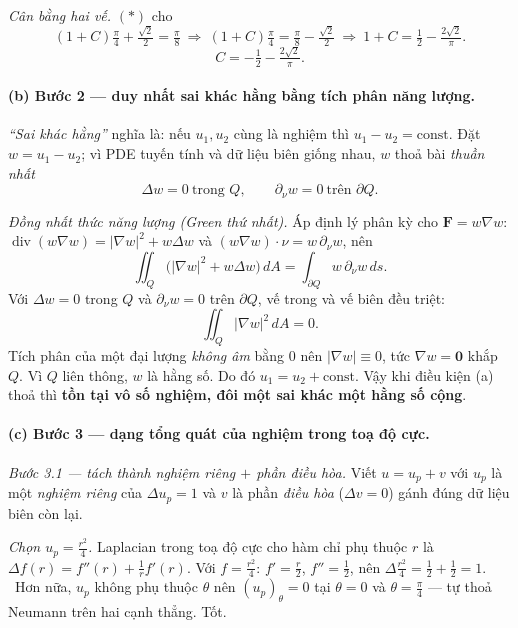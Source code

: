 \emph{Cân bằng hai vế.} $(\ast)$ cho
\[
  (1+C)\tfrac{\pi}{4}+\tfrac{\sqrt2}{2}=\tfrac{\pi}{8}
  \ \Longrightarrow\ (1+C)\tfrac{\pi}{4}=\tfrac{\pi}{8}-\tfrac{\sqrt2}{2}
  \ \Longrightarrow\ 1+C=\tfrac12-\tfrac{2\sqrt2}{\pi}.
\]
\[
  \boxed{\;C=-\tfrac12-\tfrac{2\sqrt2}{\pi}.\;}
\]

\paragraph{(b) Bước 2 --- duy nhất sai khác hằng bằng tích phân năng lượng.}\leavevmode

\emph{``Sai khác hằng''} nghĩa là: nếu $u_1,u_2$ cùng là nghiệm thì $u_1-u_2=\text{const}$. Đặt $w=u_1-u_2$; vì PDE tuyến tính và dữ liệu biên giống nhau, $w$ thoả bài \emph{thuần nhất}
\[
  \Delta w=0\ \text{trong }Q,\qquad \partial_\nu w=0\ \text{trên }\partial Q.
\]

\emph{Đồng nhất thức năng lượng (Green thứ nhất).} Áp định lý phân kỳ cho $\mathbf F=w\nabla w$: $\operatorname{div}(w\nabla w)=|\nabla w|^2+w\Delta w$ và $(w\nabla w)\cdot\nu=w\,\partial_\nu w$, nên
\[
  \iint_Q\big(|\nabla w|^2+w\Delta w\big)\,dA=\int_{\partial Q}w\,\partial_\nu w\,ds.
\]
Với $\Delta w=0$ trong $Q$ và $\partial_\nu w=0$ trên $\partial Q$, vế trong và vế biên đều triệt:
\[
  \iint_Q|\nabla w|^2\,dA=0.
\]
Tích phân của một đại lượng \emph{không âm} bằng $0$ nên $|\nabla w|\equiv0$, tức $\nabla w=\mathbf0$ khắp $Q$. Vì $Q$ liên thông, $w$ là hằng số. Do đó $u_1=u_2+\text{const}$. Vậy khi điều kiện (a) thoả thì \textbf{tồn tại vô số nghiệm, đôi một sai khác một hằng số cộng}.

\paragraph{(c) Bước 3 --- dạng tổng quát của nghiệm trong toạ độ cực.}\leavevmode

\emph{Bước 3.1 --- tách thành nghiệm riêng $+$ phần điều hòa.} Viết $u=u_p+v$ với $u_p$ là một \emph{nghiệm riêng} của $\Delta u_p=1$ và $v$ là phần \emph{điều hòa} ($\Delta v=0$) gánh đúng dữ liệu biên còn lại.

\emph{Chọn $u_p=\tfrac{r^2}{4}$.} Laplacian trong toạ độ cực cho hàm chỉ phụ thuộc $r$ là $\Delta f(r)=f''(r)+\tfrac{1}{r}f'(r)$. Với $f=\tfrac{r^2}{4}$: $f'=\tfrac{r}{2}$, $f''=\tfrac12$, nên $\Delta\tfrac{r^2}{4}=\tfrac12+\tfrac12=1$. \checkmark\ Hơn nữa, $u_p$ không phụ thuộc $\theta$ nên $(u_p)_\theta=0$ tại $\theta=0$ và $\theta=\tfrac{\pi}{4}$ --- tự thoả Neumann trên hai cạnh thẳng. Tốt.

